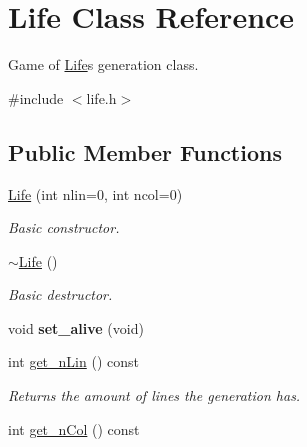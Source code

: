 \hypertarget{classLife}{}\section{Life Class Reference}
\label{classLife}


Game of \hyperlink{classLife}{Life}\textquotesingle{}s generation class.  




{\ttfamily \#include $<$life.\+h$>$}

\subsection*{Public Member Functions}
\begin{DoxyCompactItemize}
\item 
\mbox{\label{classLife_a67b9b114aeeef1672a1ab5535e1a965c}} 
\hyperlink{classLife_a67b9b114aeeef1672a1ab5535e1a965c}{Life} (int nlin=0, int ncol=0)
\begin{DoxyCompactList}\small\item\em Basic constructor. \end{DoxyCompactList}\item 
\mbox{\label{classLife_ac5a521e06906fb4f834001b2b4f7adc7}} 
\hyperlink{classLife_ac5a521e06906fb4f834001b2b4f7adc7}{$\sim$\+Life} ()
\begin{DoxyCompactList}\small\item\em Basic destructor. \end{DoxyCompactList}\item 
\mbox{\label{classLife_ad122838147a564f33fd75eabcba297db}} 
void {\bfseries set\+\_\+alive} (void)
\item 
\mbox{\label{classLife_a817a21572e8bce5138973a5a1eae2079}} 
int \hyperlink{classLife_a817a21572e8bce5138973a5a1eae2079}{get\+\_\+n\+Lin} () const
\begin{DoxyCompactList}\small\item\em Returns the amount of lines the generation has. \end{DoxyCompactList}\item 
\mbox{\label{classLife_ae5b1433f8af9f92230f8515df594b7b2}} 
int \hyperlink{classLife_ae5b1433f8af9f92230f8515df594b7b2}{get\+\_\+n\+Col} () const

\end{DoxyCompactItemize}
